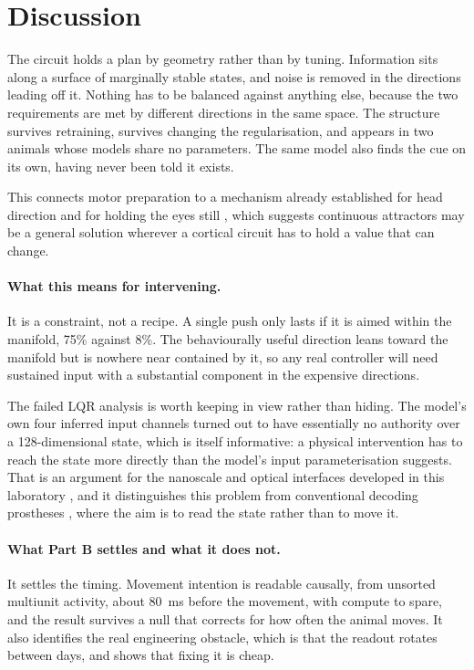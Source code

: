 \documentclass[11pt]{article}
\begin{document}
\section{Discussion}

The circuit holds a plan by geometry rather than by tuning. Information sits along
a surface of marginally stable states, and noise is removed in the directions
leading off it. Nothing has to be balanced against anything else, because the two
requirements are met by different directions in the same space. The structure
survives retraining, survives changing the regularisation, and appears in two
animals whose models share no parameters. The same model also finds the cue on
its own, having never been told it exists.

This connects motor preparation to a mechanism already established for head
direction and for holding the eyes still
\cite{seung1996,zhang1996,chaudhuri2019}, which suggests continuous attractors
may be a general solution wherever a cortical circuit has to hold a value that
can change.

\paragraph{What this means for intervening.} It is a constraint, not a recipe. A
single push only lasts if it is aimed within the manifold, 75\% against 8\%. The
behaviourally useful direction leans toward the manifold but is nowhere near
contained by it, so any real controller will need sustained input with a
substantial component in the expensive directions.

The failed LQR analysis is worth keeping in view rather than hiding. The model's
own four inferred input channels turned out to have essentially no authority over
a 128-dimensional state, which is itself informative: a physical intervention has
to reach the state more directly than the model's input parameterisation
suggests. That is an argument for the nanoscale and optical interfaces developed
in this laboratory \cite{jayant2019,gonzales2025}, and it distinguishes this
problem from conventional decoding prostheses \cite{gilja2012}, where the aim is
to read the state rather than to move it.

\paragraph{What Part B settles and what it does not.} It settles the timing.
Movement intention is readable causally, from unsorted multiunit activity, about
80~ms before the movement, with compute to spare, and the result survives a null
that corrects for how often the animal moves. It also identifies the real
engineering obstacle, which is that the readout rotates between days, and shows
that fixing it is cheap.
\end{document}
